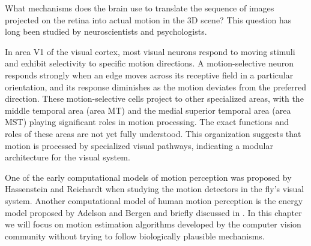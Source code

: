 
What mechanisms does the brain use to translate the sequence of images projected on the retina into actual motion in the 3D scene? This question has long been studied by neuroscientists and psychologists.

In area V1 of the visual cortex, most visual neurons respond to moving stimuli and exhibit selectivity to specific motion directions. A motion-selective neuron responds strongly when an edge moves across its receptive field in a particular orientation, and its response diminishes as the motion deviates from the preferred direction. These motion-selective cells project to other specialized areas, with the middle temporal area (area MT) and the medial superior temporal area (area MST) playing significant roles in motion processing. The exact functions and roles of these areas are not yet fully understood. This organization suggests that motion is processed by specialized visual pathways, indicating a modular architecture for the visual system.

One of the early computational models of motion perception was proposed by Hassenstein and Reichardt \cite{hassenstein1956} when studying the motion detectors in the fly's visual system. Another computational model of human motion perception is the energy model proposed by Adelson and Bergen \cite{Adelson85} and briefly discussed in \chap{\ref{chapter:filter_banks}}. In this chapter we will focus on motion estimation algorithms developed by the computer vision community without trying to follow biologically plausible mechanisms.


